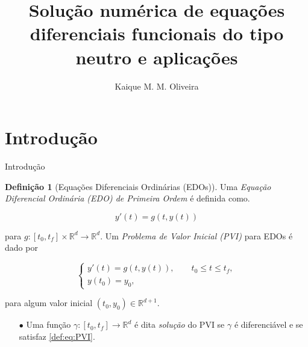 \documentclass{beamer}
\title{Solução numérica de equações diferenciais funcionais do tipo neutro e aplicações}
\author[Kaique Oliveira]{Kaique M. M. Oliveira}
\newcommand{\R}{\mathbb{R}}
\theoremstyle{plain}
\theoremstyle{definition}
\newtheorem{defi}{Definição}
\begin{document}
\typesetFrontSlides






\section{Introdução}


\begin{frame}{Introdução}

    \footnotesize
    \begin{defi}[Equações Diferenciais Ordinárias (EDOs)]
        \label{def:1:EDO} 
        Uma \textit{Equação Diferencial Ordinária (EDO) de Primeira Ordem} é definida como.

        \begin{equation}
            y'(t) = g(t, y(t))
        \end{equation}


        para $g: [t_0, t_f] \times \R^d \to \R^d$. Um \textit{Problema de Valor Inicial (PVI)} para EDOs é dado por

        \begin{equation}
            \begin{cases}
                y'(t) = g(t, y(t)), \qquad t_0 \leq t\leq t_f,\\
                y(t_0) = y_0,
            \end{cases}
            \label{def:eq:PVI}
        \end{equation}


        para algum valor inicial $(t_0, y_0) \in \R^{d+1}$. 

        \begin{enumerate}
            \item[$\bullet$] Uma função $\gamma: [t_0, t_f] \to \R^d$ é dita \textit{solução} do PVI se $\gamma$ é diferenciável e se satisfaz \ref{def:eq:PVI}.
        \end{enumerate}

    \end{defi}

\end{frame}

\end{document}
